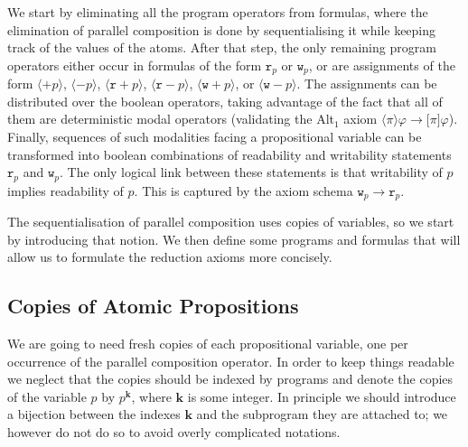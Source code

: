 \documentclass{llncs}
\newcommand{\cp}[2]{{#2}^\mathbf{#1}}
\newcommand{\pll}{ {||} }							%
\newcommand{\readable}[1]{\mathtt{r}_{#1}}
\newcommand{\writable}[1]{\mathtt{w}_{#1}}
\newcommand{\testendo}{?\!\!?}			%
\newcommand{\assgntopR}[1]{{\mathtt r {+} #1}}
\newcommand{\assgnbotR}[1]{{\mathtt r {-} #1}}
\newcommand{\assgntopW}[1]{{\mathtt w {+} #1}}
\newcommand{\assgnbotW}[1]{{\mathtt w {-} #1}}
\newcommand{\assgntopV}[1]{{\mathtt {+} #1}}
\newcommand{\assgnbotV}[1]{{\mathtt {-} #1}}
\newcommand{\lbox}[1]{ \big[ #1 \big] }
\newcommand{\ldia}[1]{ \big\langle #1 \big\rangle}
\newcommand{\leqv}{ \leftrightarrow }
\newcommand{\limp}{ \rightarrow }
\renewcommand{\phi}{\varphi}
\begin{document}
We start by eliminating all the program operators from formulas, where 
the elimination of parallel composition is done by sequentialising it while keeping track of the values of the atoms. 
After that step, the only remaining program operators 
either occur in formulas of the form $\readable p$ or $\writable p$, 
or are assignments of the form
$\ldia{ \assgntopV p} $,
$\ldia{ \assgnbotV p} $,
$\ldia{ \assgntopR p} $,
$\ldia{ \assgnbotR p} $,
$\ldia{ \assgntopW p} $, or
$\ldia{ \assgnbotW p} $. 
The assignments can be distributed over the boolean operators, taking advantage of the fact that all of them are deterministic modal operators 
(validating the Alt$_1$ axiom $\ldia \pi \phi \limp \lbox \pi \phi$). 
Finally, sequences of such modalities facing a propositional variable can be transformed into 
boolean combinations of readability and writability statements $\readable p$ and $\writable p$.
The only logical link between these statements is that 
writability of $p$ implies readability of $p$. 
This is captured by the axiom schema 
$\writable p \limp \readable p$.

The sequentialisation of parallel composition uses copies of variables, so we start by introducing that notion. 
We then define some programs and formulas 
that will allow us to formulate the reduction axioms more concisely. 

\subsection{Copies of Atomic Propositions}\label{sec:copyVars}

We are going to need fresh copies of each propositional variable, one per occurrence of the parallel composition operator. 
In order to keep things readable we neglect that the copies should be indexed by programs
and denote the copies of the variable $p$ by $\cp k p$, where $\mathbf{k}$ is some integer. 
In principle we should introduce a bijection between the indexes $\mathbf{k}$ and the subprogram they are attached to;
we however do not do so to avoid overly complicated notations.
\end{document}
